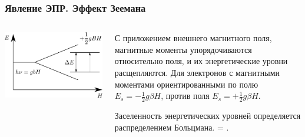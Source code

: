 \documentclass{beamer}
\begin{document}
\begin{frame}[r]
\frametitle{Явление ЭПР. Эффект Зеемана}
\begin{columns}[t]
\begin{column}{0.3\linewidth}
\begin{block}{}
\includegraphics[width=1\columnwidth]{zeeman}
\end{block}
\end{column}

\begin{column}{0.65\linewidth}
\begin{block}{}
\scriptsize{
С приложением внешнего магнитного поля, магнитные моменты упорядочиваются относительно поля, и их энергетические уровни расщепляются. Для электронов с магнитными моментами ориентированными по полю $E_{s} = -\frac{1}{2}g \beta H$, против поля $E_{s} = +\frac{1}{2}g \beta H$.

Заселенность энергетических уровней определяется распределением Больцмана.
\beq \label{bolz1}
 = \exp {}.
\eeq
}
\end{block}
\end{column}
\end{columns}
\end{frame}
\end{document}

